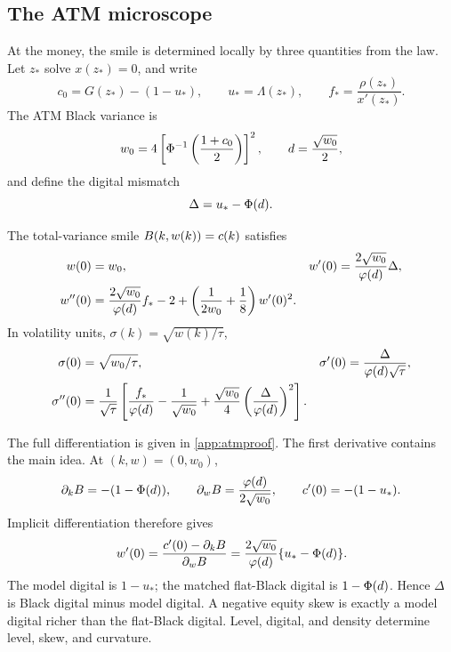 \subsection{The ATM microscope}

At the money, the smile is determined locally by three quantities from the
law.  Let $z_*$ solve $x(z_*)=0$, and write
\begin{equation}
c_0=G(z_*)-(1-u_*),\qquad
u_*=\Lambda(z_*),\qquad
f_*=\frac{\rho(z_*)}{x'(z_*)}.
\label{eq:atm_inputs}
\end{equation}
The ATM Black variance is
\[
w_0=4\left[\Phi^{-1}\left(\frac{1+c_0}{2}\right)\right]^2,
\qquad d=\frac{\sqrt{w_0}}2,
\]
and define the digital mismatch
\begin{equation}
\Delta=u_*-\Phi(d).
\label{eq:digitalgap}
\end{equation}

\begin{proposition}
\label{prop:atm}
The total-variance smile $B(k,w(k))=c(k)$ satisfies
\begin{align}
w(0)&=w_0,
&w'(0)&=\frac{2\sqrt{w_0}}{\varphi(d)}\Delta,
\label{eq:atm_w}\\
w''(0)&=\frac{2\sqrt{w_0}}{\varphi(d)}f_*-2
+\left(\frac1{2w_0}+\frac18\right)w'(0)^2.
\label{eq:atm_wpp}
\end{align}
In volatility units, $\sigma(k)=\sqrt{w(k)/\tau}$,
\begin{align}
\sigma(0)&=\sqrt{w_0/\tau},
&\sigma'(0)&=\frac{\Delta}{\varphi(d)\sqrt\tau},
\label{eq:atm_sigma1}\\
\sigma''(0)&=\frac1{\sqrt\tau}
\left[\frac{f_*}{\varphi(d)}-\frac1{\sqrt{w_0}}
+\frac{\sqrt{w_0}}4\left(\frac{\Delta}{\varphi(d)}\right)^2\right].
\label{eq:atm_sigma}
\end{align}
\end{proposition}

The full differentiation is given in \cref{app:atmproof}.  The first
derivative contains the main idea.  At $(k,w)=(0,w_0)$,
\[
\partial_kB=-(1-\Phi(d)),
\qquad
\partial_wB=\frac{\varphi(d)}{2\sqrt{w_0}},
\qquad
c'(0)=-(1-u_*).
\]
Implicit differentiation therefore gives
\begin{equation}
w'(0)=\frac{c'(0)-\partial_kB}{\partial_wB}
=\frac{2\sqrt{w_0}}{\varphi(d)}\{u_*-\Phi(d)\}.
\label{eq:skewderivation}
\end{equation}
The model digital is $1-u_*$; the matched flat-Black digital is
$1-\Phi(d)$.  Hence $\Delta$ is Black digital minus model digital.  A
negative equity skew is exactly a model digital richer than the flat-Black
digital.  Level, digital, and density determine level, skew, and curvature.

